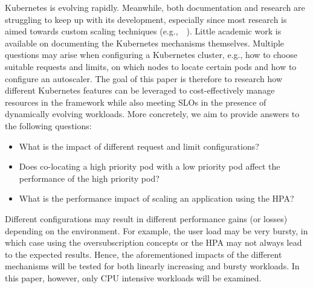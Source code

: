 Kubernetes is evolving rapidly. Meanwhile, both documentation and research are struggling to keep up with its development, especially since most research is aimed towards custom scaling techniques (e.g.,~\citep{hyscale}~\citep{caravel}). Little academic work is available on documenting the Kubernetes mechanisms themselves. Multiple questions may arise when configuring a Kubernetes cluster, e.g., how to choose suitable requests and limits, on which nodes to locate certain pods and how to configure an autoscaler. 
The goal of this paper is therefore to research how different Kubernetes features can be leveraged to cost-effectively manage resources in the framework while also meeting SLOs in the presence of dynamically evolving workloads. More concretely, we aim to provide answers to the following questions:
\begin{itemize}
    \item What is the impact of different request and limit configurations?
    \item Does co-locating a high priority pod with a low priority pod affect the performance of the high priority pod?
    \item What is the performance impact of scaling an application using the HPA?
\end{itemize}

Different configurations may result in different performance gains (or losses) depending on the environment. For example, the user load may be very bursty, in which case using the oversubscription concepts or the HPA may not always lead to the expected results. Hence, the aforementioned impacts of the different mechanisms will be tested for both linearly increasing and bursty workloads. In this paper, however, only CPU intensive workloads will be examined. 



